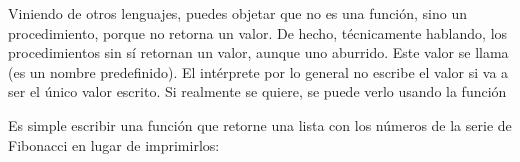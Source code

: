 \documentclass[a4,10pt,spanish]{sphinxmanual}
\begin{document}
\sphinxAtStartPar
Viniendo de otros lenguajes, puedes objetar que  no es una función, sino un procedimiento, porque no retorna un valor. De hecho, técnicamente hablando, los procedimientos sin  sí retornan un valor, aunque uno aburrido. Este valor se llama  (es un nombre predefinido). El intérprete por lo general no escribe el valor  si va a ser el único valor escrito. Si realmente se quiere, se puede verlo usando la función 

\begin{sphinxVerbatim}[commandchars=\\\{\}]
\end{sphinxVerbatim}

\sphinxAtStartPar
Es simple escribir una función que retorne una lista con los números de la serie de Fibonacci en lugar de imprimirlos:

\begin{sphinxVerbatim}[commandchars=\\\{\}]
   
    
      \PYG{p}{[}\PYG{p}{]}
        
       
            
            
     
      
                
\end{sphinxVerbatim}
\end{document}
